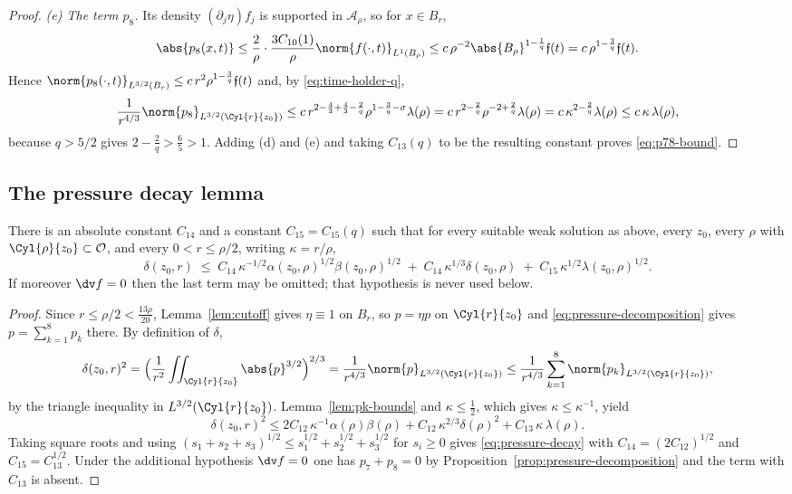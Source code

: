 \documentclass[11pt,reqno]{amsart}
\begin{document}
\begin{proof}
\emph{(e) The term $p_{8}$.} Its density $(\partial_{j}\eta)f_{j}$ is supported in
$\mathcal{A}_{\rho}$, so for $x\in B_{r}$,
\[
  \abs{p_{8}(x,t)}\le\frac2\rho\cdot\frac{3C_{10}(1)}{\rho}
      \norm{f(\cdot,t)}_{L^{1}(B_{\rho})}
  \le c\,\rho^{-2}\abs{B_{\rho}}^{1-\frac1q}\mathfrak{f}(t)
  = c\,\rho^{1-\frac3q}\mathfrak{f}(t).
\]
Hence $\norm{p_{8}(\cdot,t)}_{L^{3/2}(B_{r})}\le c\,r^{2}\rho^{1-\frac3q}\mathfrak{f}(t)$
and, by \eqref{eq:time-holder-q},
\[
  \frac{1}{r^{4/3}}\norm{p_{8}}_{L^{3/2}(\Cyl{r}{z_{0}})}
  \le c\,r^{2-\frac43+\frac43-\frac2q}\rho^{1-\frac3q-\sigma}\lambda(\rho)
  = c\,r^{2-\frac2q}\rho^{-2+\frac2q}\lambda(\rho)
  = c\,\kappa^{2-\frac2q}\lambda(\rho)\le c\,\kappa\,\lambda(\rho),
\]
because $q>5/2$ gives $2-\tfrac2q>\tfrac65>1$. Adding (d) and (e) and taking
$C_{13}(q)$ to be the resulting constant proves \eqref{eq:p78-bound}.
\end{proof}

\subsection{The pressure decay lemma}\label{ss:pressure-decay}

\begin{theorem}\label{thm:pressure-decay}
There is an absolute constant $C_{14}$ and a constant $C_{15}=C_{15}(q)$ such
that for every suitable weak solution as above, every $z_{0}$, every $\rho$ with
$\Cyl{\rho}{z_{0}}\subset\mathcal{O}$, and every $0<r\le\rho/2$, writing
$\kappa=r/\rho$,
\begin{equation}\label{eq:pressure-decay}
  \delta(z_{0},r)
  \;\le\;C_{14}\,\kappa^{-1/2}\alpha(z_{0},\rho)^{1/2}\beta(z_{0},\rho)^{1/2}
   \;+\;C_{14}\,\kappa^{1/3}\delta(z_{0},\rho)
   \;+\;C_{15}\,\kappa^{1/2}\lambda(z_{0},\rho)^{1/2} .
\end{equation}
If moreover $\dv f=0$ then the last term may be omitted; that hypothesis is
never used below.
\end{theorem}

\begin{proof}
Since $r\le\rho/2<\tfrac{13\rho}{20}$, Lemma~\ref{lem:cutoff} gives $\eta\equiv1$
on $B_{r}$, so $p=\eta p$ on $\Cyl{r}{z_{0}}$ and
\eqref{eq:pressure-decomposition} gives
$p=\sum_{k=1}^{8}p_{k}$ there. By definition of $\delta$,
\[
  \delta(z_{0},r)^{2}
  =\Bigl(\frac1{r^{2}}\iint_{\Cyl{r}{z_{0}}}\abs{p}^{3/2}\Bigr)^{2/3}
  =\frac{1}{r^{4/3}}\norm{p}_{L^{3/2}(\Cyl{r}{z_{0}})}
  \le\frac{1}{r^{4/3}}\sum_{k=1}^{8}\norm{p_{k}}_{L^{3/2}(\Cyl{r}{z_{0}})} ,
\]
by the triangle inequality in $L^{3/2}(\Cyl{r}{z_{0}})$. Lemma~\ref{lem:pk-bounds}
and $\kappa\le\tfrac12$, which gives $\kappa\le\kappa^{-1}$, yield
\[
  \delta(z_{0},r)^{2}
  \le 2C_{12}\,\kappa^{-1}\alpha(\rho)\beta(\rho)
    +C_{12}\,\kappa^{2/3}\delta(\rho)^{2}
    +C_{13}\,\kappa\,\lambda(\rho).
\]
Taking square roots and using
$(s_{1}+s_{2}+s_{3})^{1/2}\le s_{1}^{1/2}+s_{2}^{1/2}+s_{3}^{1/2}$ for
$s_{i}\ge0$ gives \eqref{eq:pressure-decay} with
$C_{14}=(2C_{12})^{1/2}$ and $C_{15}=C_{13}^{1/2}$. Under the additional
hypothesis $\dv f=0$ one has $p_{7}+p_{8}=0$ by
Proposition~\ref{prop:pressure-decomposition} and the term with $C_{13}$ is
absent.
\end{proof}
\end{document}
